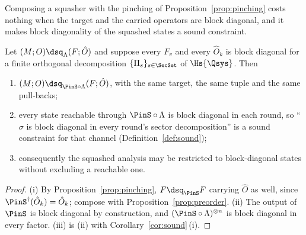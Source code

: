 
Composing a squasher with the pinching of Proposition~\ref{prop:pinching}
costs nothing when the target and the carried operators are block diagonal,
and it makes block diagonality of the squashed states a sound constraint.

\begin{corollary}\label{cor:blockdiag}
Let $(M;O)\dsq_{\Lambda}(F;\hat O)$ and suppose every $F_v$ and every
$\hat O_k$ is block diagonal for a finite orthogonal decomposition
$\{\Pi_s\}_{s\in\SecSet}$ of $\Hs{\Qsys}$. Then
\begin{enumerate}[label=(\roman*),leftmargin=3.0em]
\item $(M;O)\dsq_{\PinS\circ\Lambda}(F;\hat O)$, with the same target, the same
  tuple and the same pull-backs;
\item every state reachable through $\PinS\circ\Lambda$ is block diagonal in
  each round, so ``$\sigma$ is block diagonal in every round's sector
  decomposition'' is a sound constraint for that channel
  (Definition~\ref{def:sound});
\item consequently the squashed analysis may be restricted to block-diagonal
  states without excluding a reachable one.
\end{enumerate}
\end{corollary}

\begin{proof}
(i) By Proposition~\ref{prop:pinching}, $F\dsq_{\PinS}F$ carrying $\hat O$ as
well, since $\PinS^{\dagger}(\hat O_k)=\hat O_k$; compose with
Proposition~\ref{prop:preorder}. (ii) The output of $\PinS$ is block diagonal
by construction, and $(\PinS\circ\Lambda)^{\otimes n}$ is block diagonal in
every factor. (iii) is (ii) with Corollary~\ref{cor:sound}\,(i).
\end{proof}
